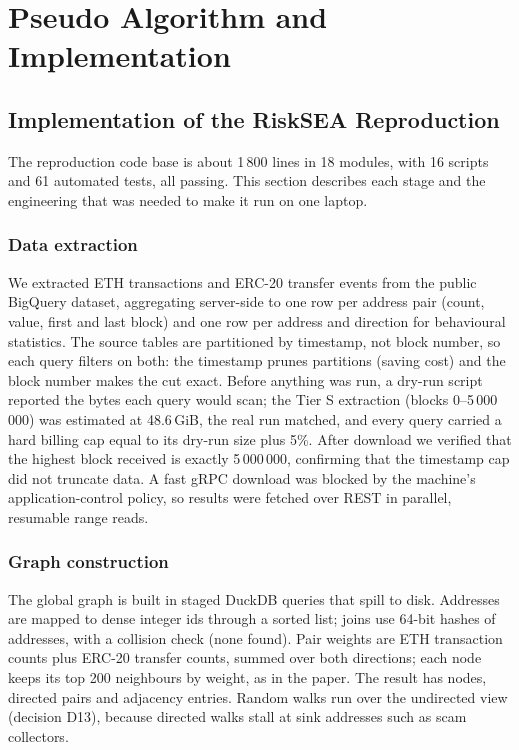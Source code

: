 \chapter{Pseudo Algorithm and Implementation}
\label{ch:impl}

\section{Implementation of the RiskSEA Reproduction}
The reproduction code base is about 1\,800 lines in 18 modules, with 16 scripts and 61 automated tests, all passing. This section describes each stage and the engineering that was needed to make it run on one laptop.

\subsection{Data extraction}
We extracted ETH transactions and ERC-20 transfer events from the public  BigQuery dataset, aggregating server-side to one row per address pair (count, value, first and last block) and one row per address and direction for behavioural statistics. The source tables are partitioned by timestamp, not block number, so each query filters on both: the timestamp prunes partitions (saving cost) and the block number makes the cut exact. Before anything was run, a dry-run script reported the bytes each query would scan; the Tier S extraction (blocks 0--5\,000\,000) was estimated at 48.6\,GiB, the real run matched, and every query carried a hard billing cap equal to its dry-run size plus 5\%. After download we verified that the highest block received is exactly 5\,000\,000, confirming that the timestamp cap did not truncate data. A fast gRPC download was blocked by the machine's application-control policy, so results were fetched over REST in parallel, resumable range reads.

\subsection{Graph construction}
The global graph is built in staged DuckDB queries that spill to disk. Addresses are mapped to dense integer ids through a sorted list; joins use 64-bit hashes of addresses, with a collision check (none found). Pair weights are ETH transaction counts plus ERC-20 transfer counts, summed over both directions; each node keeps its top 200 neighbours by weight, as in the paper. The result has \NumNodes{} nodes, \NumPairs{} directed pairs and \NumAdj{} adjacency entries. Random walks run over the undirected view (decision D13), because directed walks stall at sink addresses such as scam collectors.

